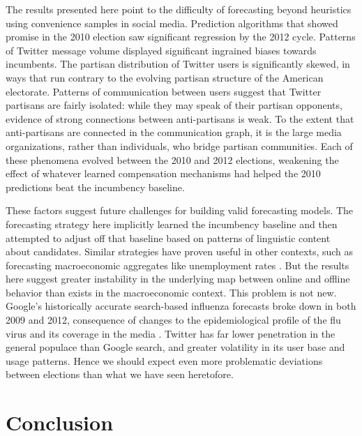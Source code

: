 \documentclass{acm_proc_article-sp}
\begin{document}
The results presented here point to the difficulty of forecasting
beyond heuristics using 
convenience samples in social media. Prediction algorithms that showed
promise in the 2010 election saw significant regression by the 2012
cycle. Patterns of Twitter message volume displayed significant
ingrained biases towards incumbents. The partisan distribution of
Twitter users is significantly skewed, in ways that run contrary to
the evolving partisan structure of the American electorate. Patterns
of communication between users suggest that Twitter partisans are
fairly isolated: while they may speak of their partisan opponents,
evidence of strong connections between anti-partisans is weak. To the
extent that anti-partisans are connected in the communication graph,
it is the large media organizations, rather than individuals, who
bridge partisan communities. Each of these phenomena evolved between
the 2010 and 2012 elections, weakening the effect of whatever learned
compensation mechanisms had helped the 2010 predictions beat the
incumbency baseline.

These factors suggest future challenges for building valid forecasting
models. The forecasting strategy here implicitly learned the
incumbency baseline and then attempted to adjust off that baseline
based on patterns of linguistic content about candidates. Similar
strategies have proven useful in other contexts, such as forecasting
macroeconomic aggregates like unemployment rates
\cite{choi2012predicting}. But the results here suggest greater
instability in the underlying map between online and offline behavior
than exists in the macroeconomic context. This problem is not
new. Google's historically accurate search-based influenza forecasts
\cite{ginsberg2008detecting} broke down in both 2009 and 2012,
consequence of changes to the epidemiological profile of the flu virus
and its coverage in the media \cite{butler2013google}. Twitter has
far lower penetration in the general populace than Google search, and
greater volatility in its user base and usage patterns. Hence we
should expect even more problematic deviations between elections than
what we have seen heretofore. 



\section{Conclusion}
\label{sec:conclusion}
\end{document}
